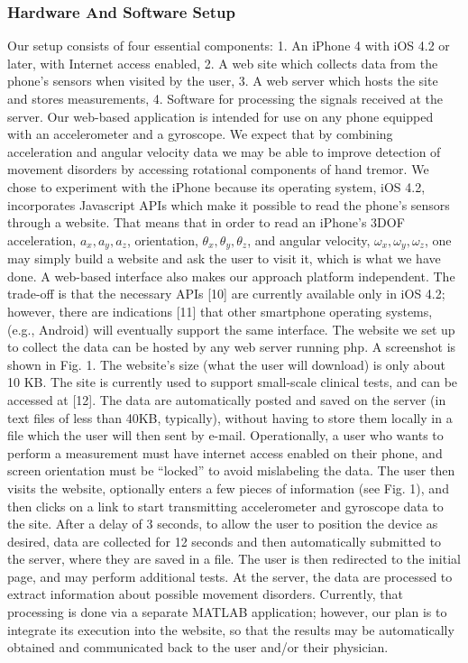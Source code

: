 \subsubsection{Hardware And Software Setup}
\label{subsubsec:smartCT1SetUp}
Our setup consists of four essential components:
1. An iPhone 4 with iOS 4.2 or later, with Internet access enabled,
2. A web site which collects data from the phone’s sensors when visited by the user,
3. A web server which  hosts the site and stores measurements,
4. Software for processing the signals received at the server.
Our web-based application is intended for use on any phone equipped with an accelerometer and a gyroscope. We expect that by combining acceleration and angular velocity data we may be able to improve detection of movement disorders by accessing rotational components of hand tremor. We chose to experiment with the iPhone because its operating system, iOS 4.2, incorporates Javascript APIs which make it possible to read the phone’s sensors through a website. That means that in order to read an iPhone’s 3DOF acceleration, $a_x,a_y,a_z$, orientation, $θ_x,θ_y,θ_z$,  and angular velocity, $ω_x,ω_y,ω_z$,  one may simply build a website and ask the user to visit it, which is what we have done.
A web-based interface also makes our approach platform independent. The trade-off is that the necessary APIs [10] are currently available only in iOS 4.2; however, there are indications [11] that other smartphone operating systems, (e.g., Android) will eventually support the same interface.
The website we set up to collect the data can be hosted by any web server running php. A screenshot is shown in Fig. 1. The website’s size (what the user will download) is only about 10 KB. The site is currently used to support small-scale clinical tests, and can be accessed at [12]. The data are automatically posted and saved on the server (in text files of less than 40KB, typically), without having to store them locally in a file which the user will then sent by e-mail. 
Operationally, a user who wants to perform a measurement must have internet access enabled on their phone, and screen orientation must be “locked” to avoid mislabeling the data. The user then visits the website, optionally enters a few pieces of information (see Fig. 1), and then clicks on a link to start transmitting accelerometer and gyroscope data to the site. After a delay of 3 seconds, to allow the user to position the device as desired, data are collected for 12 seconds and then automatically submitted to the server, where they are saved in a file. The user is then redirected to the initial page, and may perform additional tests. At the server, the data are processed to extract information about possible movement disorders. Currently, that processing is done via a separate MATLAB application; however, our plan is to integrate its execution into the website, so that the results may be automatically obtained and communicated back to the user and/or their physician.  


